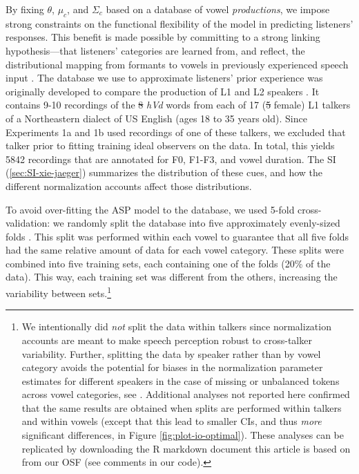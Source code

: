 \documentclass[preprint]{JASA}
\providecommand{\DIFadd}[1]{{\protect\color{blue}\uwave{#1}}} %
\providecommand{\DIFdel}[1]{{\protect\color{red}\sout{#1}}}                      %
\providecommand{\DIFaddbegin}{} %
\providecommand{\DIFaddend}{} %
\providecommand{\DIFdelbegin}{} %
\providecommand{\DIFdelend}{} %
\begin{document}
By fixing \(\theta\), \(\mu_c\), and \(\Sigma_c\) based on a database of vowel \emph{productions}, we impose strong constraints on the functional flexibility of the model in predicting listeners' responses. This benefit is made possible by committing to a strong linking hypothesis---that listeners' categories are learned from, and reflect, the distributional mapping from formants to vowels in previously experienced speech input \citep[e.g.,][]{abramson-lisker1973, massaro-friedman1990, nearey-hogan1986}. The database we use to approximate listeners' prior experience was originally developed to compare the production of L1 and L2 speakers \citep{xie-jaeger2020}. It contains 9-10 recordings of the \DIFdelbegin \DIFdel{8 }\DIFdelend \DIFaddbegin \DIFadd{eight }\DIFaddend \emph{hVd} words from each of 17 (\DIFdelbegin \DIFdel{5 }\DIFdelend \DIFaddbegin \DIFadd{five }\DIFaddend female) L1 talkers of a Northeastern dialect of US English (ages 18 to 35 years old). Since Experiments 1a and 1b used recordings of one of these talkers, we excluded that talker prior to fitting training ideal observers on the data. In total, this yields 5842 recordings that are annotated for F0, F1-F3, and vowel duration. The SI (\ref{sec:SI-xie-jaeger}) summarizes the distribution of these cues, and how the different normalization accounts affect those distributions.

To avoid over-fitting the ASP model to the database, we used 5-fold cross-validation: we randomly split the \citet{xie-jaeger2020} database into five approximately evenly-sized folds \citep[following][]{persson-jaeger2023}. This split was performed within each vowel to guarantee that all five folds had the same relative amount of data for each vowel category. These splits were combined into five training sets, each containing one of the folds (20\% of the data). This way, each training set was different from the others, increasing the variability between sets.\footnote{We intentionally did \emph{not} split the data within talkers since normalization accounts are meant to make speech perception robust to cross-talker variability. Further, splitting the data by speaker rather than by vowel category avoids the potential for biases in the normalization parameter estimates for different speakers in the case of missing or unbalanced tokens across vowel categories, see \citep{barreda-nearey2018}. Additional analyses not reported here confirmed that the same results are obtained when splits are performed within talkers and within vowels (except that this lead to smaller CIs, and thus \emph{more} significant differences, in Figure \ref{fig:plot-io-optimal}). These analyses can be replicated by downloading the R markdown document this article is based on from our OSF (see comments in our code).}
\end{document}
